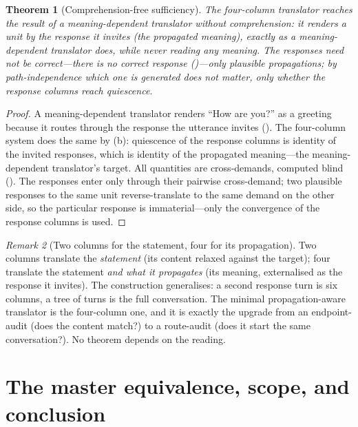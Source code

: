 \documentclass[twocolumn,11pt,a4paper]{article}
\theoremstyle{sup}
\newtheorem{theorem}{Theorem}[section]
\theoremstyle{definition}
\theoremstyle{remark}
\newtheorem{remark}[theorem]{Remark}
\begin{document}
\begin{theorem}[Comprehension-free sufficiency]
\label{thm:compfree}
The four-column translator reaches the result of a meaning-dependent translator
without comprehension: it renders a unit by the response it invites (the
propagated meaning), exactly as a meaning-dependent translator does, while never
reading any meaning. The responses need not be correct---there is no correct
response ()---only plausible propagations; by path-independence
which one is generated does not matter, only whether the response columns reach
quiescence.
\end{theorem}

\begin{proof}
A meaning-dependent translator renders ``How are you?'' as a greeting because it
routes through the response the utterance invites (). The
four-column system does the same by (b): quiescence of the
response columns is identity of the invited responses, which is identity of the
propagated meaning---the meaning-dependent translator's target. All quantities
are cross-demands, computed blind (). The responses enter
only through their pairwise cross-demand; two plausible responses to the same
unit reverse-translate to the same demand on the other side, so the particular
response is immaterial---only the convergence of the response columns is used.
\end{proof}

\begin{remark}[Two columns for the statement, four for its propagation]
\label{rem:fourgen}
Two columns translate the \emph{statement} (its content relaxed against the
target); four translate the statement \emph{and what it propagates} (its meaning,
externalised as the response it invites). The construction generalises: a second
response turn is six columns, a tree of turns is the full conversation. The
minimal propagation-aware translator is the four-column one, and it is exactly
the upgrade from an endpoint-audit (does the content match?) to a route-audit
(does it start the same conversation?). No theorem depends on the reading.
\end{remark}

\section{The master equivalence, scope, and conclusion}
\label{sec:master}
\end{document}

